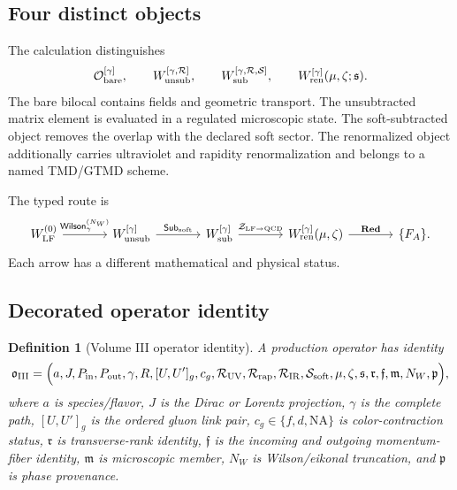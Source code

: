 \documentclass[11pt]{article}
\newtheorem{definition}{Definition}[section]
\newcommand{\LF}{\mathrm{LF}}
\newcommand{\QCD}{\mathrm{QCD}}
\newcommand{\Red}{\mathbf{Red}}
\newcommand{\cO}{\mathcal O}
\newcommand{\cR}{\mathcal R}
\newcommand{\cS}{\mathcal S}
\newcommand{\cZ}{\mathcal Z}
\newcommand{\unsub}{\mathrm{unsub}}
\newcommand{\subtr}{\mathrm{sub}}
\newcommand{\ren}{\mathrm{ren}}
\newcommand{\soft}{\mathrm{soft}}
\newcommand{\rap}{\mathrm{rap}}
\newcommand{\UV}{\mathrm{UV}}
\newcommand{\IR}{\mathrm{IR}}
\begin{document}
\subsection{Four distinct objects}

The calculation distinguishes
\begin{equation}
 \cO_{\rm bare}^{[\gamma]},
 \qquad
 W_{\unsub}^{[\gamma,\cR]},
 \qquad
 W_{\subtr}^{[\gamma,\cR,\cS]},
 \qquad
 W_{\ren}^{[\gamma]}(\mu,\zeta;\mathfrak s).
\label{eq:four-operator-levels}
\end{equation}
The bare bilocal contains fields and geometric transport.  The unsubtracted
matrix element is evaluated in a regulated microscopic state.  The
soft-subtracted object removes the overlap with the declared soft sector.
The renormalized object additionally carries ultraviolet and rapidity
renormalization and belongs to a named TMD/GTMD scheme.

The typed route is
\begin{equation}
\begin{tikzcd}[column sep=large]
W_{\LF}^{(0)}
 \arrow[r,"\mathsf{Wilson}_{\gamma}^{(N_W)}"]
& W_{\unsub}^{[\gamma]}
 \arrow[r,"\mathsf{Sub}_{\soft}"]
& W_{\subtr}^{[\gamma]}
 \arrow[r,"\cZ_{\LF\to\QCD}"]
& W_{\ren}^{[\gamma]}(\mu,\zeta)
 \arrow[r,"\Red"]
& \{F_A\}.
\end{tikzcd}
\label{eq:typed-wilson-route}
\end{equation}
Each arrow has a different mathematical and physical status.

\subsection{Decorated operator identity}

\begin{definition}[Volume III operator identity]
\label{def:volume3-operator-id}
A production operator has identity
\begin{equation}
 \mathfrak o_{\rm III}
 =\Bigl(
 a,J,P_{\rm in},P_{\rm out},\gamma,R,
 [U,U']_g,c_g,
 \cR_{\UV},\cR_{\rap},\cR_{\IR},
 \cS_{\soft},\mu,\zeta,\mathfrak s,
 \mathfrak r,\mathfrak f,\mathfrak m,
 N_W,\mathfrak p
 \Bigr),
\label{eq:volume3-operator-id}
\end{equation}
where \(a\) is species/flavor, \(J\) is the Dirac or Lorentz projection,
\(\gamma\) is the complete path, \([U,U']_g\) is the ordered gluon link pair,
\(c_g\in\{f,d,\mathrm{NA}\}\) is color-contraction status,
\(\mathfrak r\) is transverse-rank identity, \(\mathfrak f\) is the incoming
and outgoing momentum-fiber identity, \(\mathfrak m\) is microscopic member,
\(N_W\) is Wilson/eikonal truncation, and \(\mathfrak p\) is phase provenance.
\end{definition}
\end{document}

